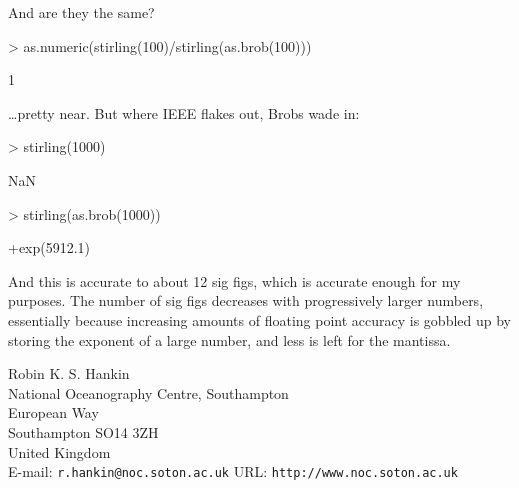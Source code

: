 \documentclass[a4paper]{article}
\begin{document}
And are they the same?

\begin{Schunk}
\begin{Sinput}
> as.numeric(stirling(100)/stirling(as.brob(100)))
\end{Sinput}
\begin{Soutput}
[1] 1
\end{Soutput}
\end{Schunk}

\ldots pretty near.  But where IEEE flakes out, Brobs wade in:

\begin{Schunk}
\begin{Sinput}
> stirling(1000)
\end{Sinput}
\begin{Soutput}
[1] NaN
\end{Soutput}
\begin{Sinput}
> stirling(as.brob(1000))
\end{Sinput}
\begin{Soutput}
[1] +exp(5912.1)
\end{Soutput}
\end{Schunk}


And this is accurate to about 12 sig figs, which is accurate enough
for my purposes.  The number of sig figs decreases with progressively
larger numbers, essentially because increasing amounts of floating
point accuracy is gobbled up by storing the exponent of a large
number, and less is left for the mantissa.

\newpage



  \noindent
  Robin K. S. Hankin\\
  National Oceanography Centre, Southampton\\
  European Way\\
  Southampton SO14 3ZH\\
  United Kingdom\\
  E-mail: {\tt r.hankin@noc.soton.ac.uk}
  URL: {\tt http://www.noc.soton.ac.uk}
\end{document}

